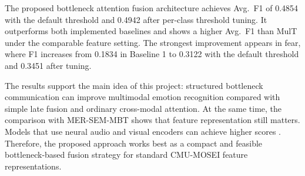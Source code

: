 The proposed bottleneck attention fusion architecture achieves Avg.~F1 of 0.4854 with the default threshold and 0.4942 after per-class threshold tuning. It outperforms both implemented baselines and shows a higher Avg.~F1 than MulT under the comparable feature setting. The strongest improvement appears in fear, where F1 increases from 0.1834 in Baseline 1 to 0.3122 with the default threshold and 0.3451 after tuning.

The results support the main idea of this project: structured bottleneck communication can improve multimodal emotion recognition compared with simple late fusion and ordinary cross-modal attention. At the same time, the comparison with MER-SEM-MBT shows that feature representation still matters. Models that use neural audio and visual encoders can achieve higher scores \cite{xia2022multimodal}. Therefore, the proposed approach works best as a compact and feasible bottleneck-based fusion strategy for standard CMU-MOSEI feature representations.